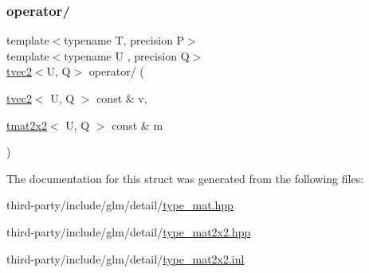 \mbox{\label{structglm_1_1detail_1_1tmat2x2_af5138f235b2448c769a37e7d222a5ab6}} 
\subsubsection{\texorpdfstring{operator/}{operator/}\hspace{0.1cm}{\footnotesize\ttfamily [2/2]}}
{\footnotesize\ttfamily template$<$typename T, precision P$>$ \\
template$<$typename U , precision Q$>$ \\
\hyperlink{structglm_1_1detail_1_1tvec2}{tvec2}$<$U, Q$>$ operator/ (\begin{DoxyParamCaption}\item[{\hyperlink{structglm_1_1detail_1_1tvec2}{tvec2}$<$ U, Q $>$ const \&}]{v,  }\item[{\hyperlink{structglm_1_1detail_1_1tmat2x2}{tmat2x2}$<$ U, Q $>$ const \&}]{m }\end{DoxyParamCaption})\hspace{0.3cm}{\ttfamily [friend]}}



The documentation for this struct was generated from the following files\+:\begin{DoxyCompactItemize}
\item 
third-\/party/include/glm/detail/\hyperlink{type__mat_8hpp}{type\+\_\+mat.\+hpp}\item 
third-\/party/include/glm/detail/\hyperlink{type__mat2x2_8hpp}{type\+\_\+mat2x2.\+hpp}\item 
third-\/party/include/glm/detail/\hyperlink{type__mat2x2_8inl}{type\+\_\+mat2x2.\+inl}\end{DoxyCompactItemize}
